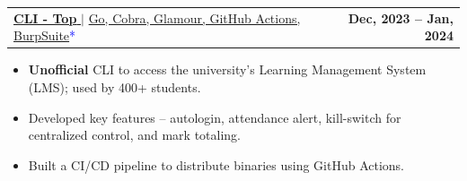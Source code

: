 \documentclass[letterpaper,11pt]{article}
\makeatletter
\newcommand{\uniformunderline}[1]{%
  \uline{\phantom{#1}}%
  \llap{\contour{white}{#1}}%
}
\newcommand{\resumeItem}[1]{
  \item\small{
    {#1 \vspace{-1.5pt}}
  }
}
\newcommand{\resumeProjectHeading}[2]{
    \item
    \begin{tabular*}{1.001\textwidth}{l@{\extracolsep{\fill}}r}
      \small#1 & \textbf{\small #2}\\
    \end{tabular*}\vspace{-7pt}
}
\newcommand{\resumeItemListStart}{\begin{itemize}}
\newcommand{\resumeItemListEnd}{\end{itemize}\vspace{-5pt}}
\makeatother
\begin{document}
        \resumeProjectHeading
            {\href{https://cli-top.acmvit.in}{\textbf{\large{CLI - Top}} \href{https://cli-top.acmvit.in}{\footnotesize{\raisebox{-0.1\height}\faExternalLink}}} $|$ \normalsize{\href{https://github.com/ACM-VIT/cli-top}{Go, Cobra, Glamour, GitHub Actions, BurpSuite}}\textcolor{blue}{\small{*}}}{Dec, 2023 -- Jan, 2024}
            \vspace{-11pt}
            \resumeItemListStart
                \resumeItem{\normalsize{\textbf{Unofficial} CLI to access the university's Learning Management System (LMS); used by 400+ students.}} 
                \resumeItem{\normalsize{Developed key features -- autologin, attendance alert, kill-switch for centralized control, and mark totaling.}}
                \resumeItem{\normalsize{Built a CI/CD pipeline to distribute binaries using GitHub Actions.}}
            \resumeItemListEnd
            \vspace{-15pt}
      

\end{document}
